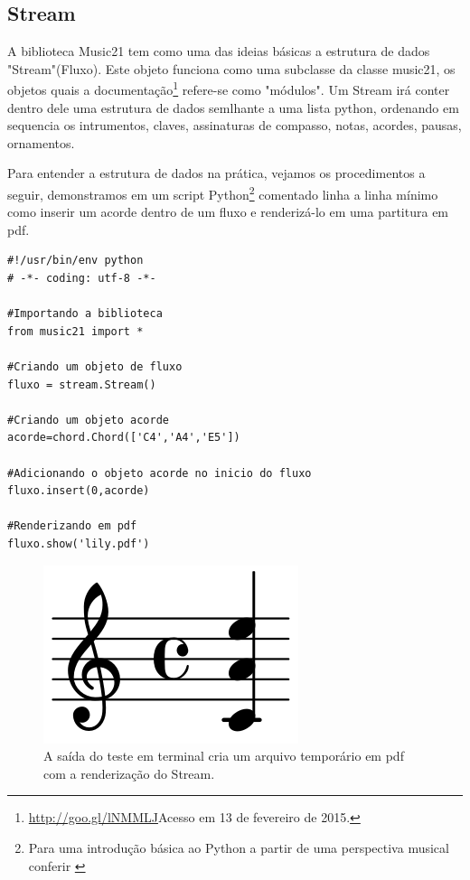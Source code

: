 \documentclass[
	12pt,				%
	openright,			%
	twoside,			%
	a4paper,			%
	english,			%
	french,				%
	spanish,			%
	brazil				%
	]{abntex2}
\begin{document}
\subsection{Stream}

A biblioteca Music21 tem como uma das ideias básicas a estrutura de dados "Stream"(Fluxo). Este objeto funciona como uma subclasse da classe music21, os objetos quais a documentação\footnote{\url{http://goo.gl/lNMMLJ}Acesso em 13 de fevereiro de 2015.} refere-se  como "módulos". Um Stream irá conter dentro dele uma estrutura de dados semlhante a uma lista python, ordenando em sequencia os intrumentos, claves, assinaturas de compasso, notas, acordes, pausas, ornamentos.

Para entender a estrutura de dados na prática, vejamos os procedimentos a seguir, demonstramos em um script Python\footnote{Para uma introdução básica ao Python a partir de uma perspectiva musical conferir \cite{Kroger201208} } comentado linha a linha mínimo como inserir um acorde dentro de um fluxo e renderizá-lo em uma partitura em pdf.

\pagebreak

 
\begin{lstlisting}
#!/usr/bin/env python
# -*- coding: utf-8 -*-

#Importando a biblioteca
from music21 import *

#Criando um objeto de fluxo 
fluxo = stream.Stream()

#Criando um objeto acorde
acorde=chord.Chord(['C4','A4','E5'])

#Adicionando o objeto acorde no inicio do fluxo
fluxo.insert(0,acorde)

#Renderizando em pdf
fluxo.show('lily.pdf')
\end{lstlisting}
 

\begin{figure}[!h]
	\caption{\label{fig_grafico} A saída do teste em terminal cria um arquivo temporário em pdf com a renderização do Stream.}
	\begin{center}
	    \includegraphics[scale=0.3]{estudosM21/acorde01.png}
	\end{center}
\end{figure}
\end{document}
